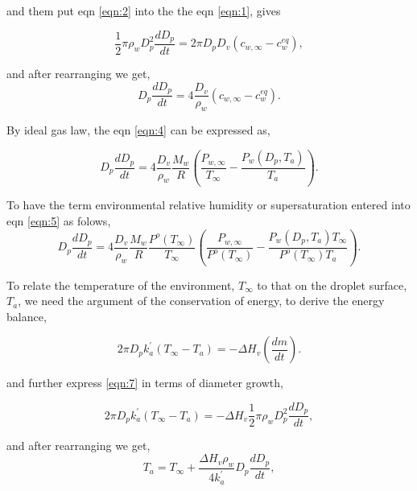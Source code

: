 \documentclass[12pt]{amsart}
\begin{document}
and them put eqn \ref{eqn:2} into the the eqn \ref{eqn:1}, gives

\begin{equation}\label{eqn:3}
\frac{1}{2} \pi \rho_{w} D_{p}^{2} \frac{dD_{p}}{dt}= 2 \pi D_{p} D_{v} (c_{w, \infty} - c_{w}^{eq}),
\end{equation}

and after rearranging we get, 
\begin{equation}\label{eqn:4}
D_{p}\frac{dD_{p}}{dt}=4 \frac{D_{v}} {\rho_{w}} (c_{w, \infty} - c_{w}^{eq}).
\end{equation}

By ideal gas law, the eqn \ref{eqn:4} can be expressed as,

\begin{equation}\label{eqn:5}
D_{p}\frac{dD_{p}}{dt}=4 \frac{D_{v}} {\rho_{w}} \frac{M_{w}}{R} (\frac{P_{w, \infty}}{T_{\infty}} - \frac{P_{w}(D_{p}, T_{a})}{T_{a}}).
\end{equation}

To have the term environmental relative humidity or supersaturation entered into eqn \ref{eqn:5} as folows,  
\begin{equation}\label{eqn:6}
D_{p}\frac{dD_{p}}{dt}=4  \frac{D_{v}} {\rho_{w}} \frac{M_{w}}{R} \frac{P^{o}(T_{\infty})} {T_{\infty}} (\frac{P_{w, \infty}}{P^{o}(T_{\infty})} - \frac{P_{w}(D_{p}, T_{a}) T_{\infty}}{P^{o}(T_{\infty}) T_{a}}).
\end{equation}

To relate the temperature of the environment, $T_{\infty}$ to that on the droplet surface, $T_{a}$, we need the argument of the conservation of energy, to derive the energy balance,

\begin{equation}\label{eqn:7}
2 \pi D_{p} k^{'}_{a} (T_{\infty}-T_{a})= -\Delta H_{v}(\frac{dm}{dt}).
\end{equation}

and further express \ref{eqn:7} in terms of diameter growth, 

\begin{equation}\label{eqn:8}
2 \pi D_{p} k^{'}_{a} (T_{\infty}-T_{a})= -\Delta H_{v} \frac{1}{2} \pi \rho_{w} D_{p}^{2} \frac{dD_{p}}{dt},
\end{equation}

and after rearranging we get, 
\begin{equation}\label{eqn:9}
T_{a}= T_{\infty} + \frac{\Delta H_{v}  \rho_{w}}{4 k^{'}_{a}} D_{p} \frac{dD_{p}}{dt},
\end{equation}
\end{document}
